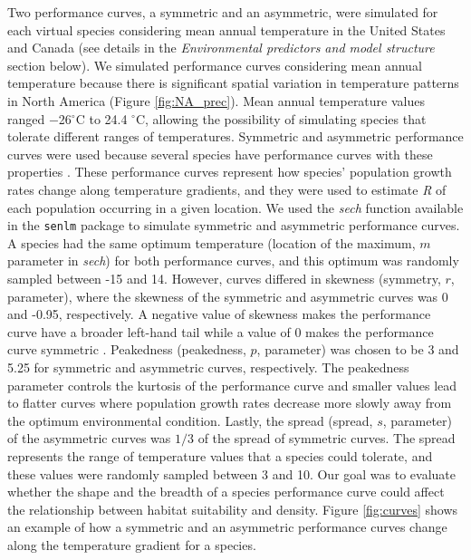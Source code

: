 Two performance curves, a symmetric and an asymmetric, were simulated for each virtual species considering mean annual temperature in the United States and Canada (see details in the \textit{Environmental predictors and model structure} section below). We simulated performance curves considering mean annual temperature because there is significant spatial variation in temperature patterns in North America (Figure \ref{fig:NA_prec}). Mean annual temperature values ranged $-$26$^{\circ}$C to 24.4 $^{\circ}$C, allowing the possibility of simulating species that tolerate different ranges of temperatures. Symmetric and asymmetric performance curves were used because several species have performance curves with these properties \parencite{oksanen2002, vasseur2014}. These performance curves represent how species' population growth rates change along temperature gradients, and they were used to estimate \textit{R} of each population occurring in a given location. We used the \textit{sech} function available in the \texttt{senlm} package \parencite{anderson2022} to simulate symmetric and asymmetric performance curves. A species had the same optimum temperature (location of the maximum, $m$ parameter in \textit{sech}) for both performance curves, and this optimum was randomly sampled between -15 and 14. However, curves differed in skewness (symmetry, $r$, parameter), where the skewness of the symmetric and asymmetric curves was  0 and -0.95, respectively. A negative value of skewness makes the performance curve have a broader left-hand tail while a value of 0 makes the performance curve symmetric \parencite{anderson2022}. Peakedness (peakedness, $p$, parameter) was chosen to be 3 and 5.25 for symmetric and asymmetric curves, respectively. The peakedness parameter controls the kurtosis of the performance curve and smaller values lead to flatter curves where population growth rates decrease more slowly away from the optimum environmental condition. Lastly, the spread (spread, $s$, parameter) of the asymmetric curves was $1/3$ of the spread of symmetric curves. The spread represents the range of temperature values that a species could tolerate, and these values were randomly sampled between 3 and 10. Our goal was to evaluate whether the shape and the breadth of a species performance curve could affect the relationship between habitat suitability and density. Figure \ref{fig:curves} shows an example of how a symmetric and an asymmetric performance curves change along the temperature gradient for a species. 

